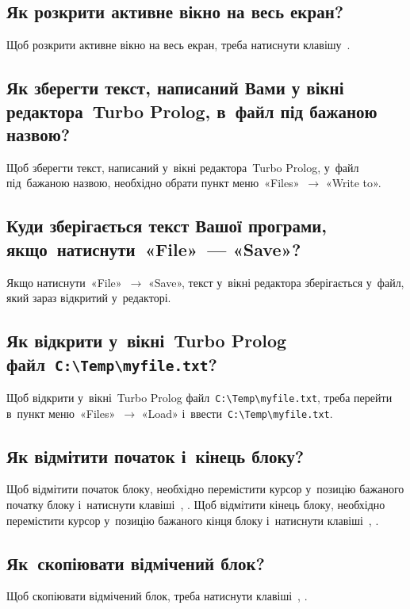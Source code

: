 \documentclass[
	a4paper,
	oneside,
	BCOR = 10mm,
	DIV = 12,
	12pt,
	headings = normal,
]{scrartcl}
\newcommand{\filename}[1]{\texttt{#1}}
\newcommand{\Mytextrightarrow}{$\rightarrow$}
\begin{document}
		\subsection{Як розкрити активне вікно на весь екран?}
			Щоб розкрити активне вікно на весь екран, треба натиснути клавішу~.

		\subsection{Як зберегти текст, написаний Вами у вікні редактора~\textenglish{Turbo Prolog}, в~файл під бажаною назвою?}
			Щоб зберегти текст, написаний у~вікні редактора~\textenglish{Turbo Prolog}, у~файл під~бажаною назвою, необхідно обрати пункт меню~«\textenglish{Files}»~\Mytextrightarrow{ } «\textenglish{Write to}».

		\subsection{Куди зберігається текст Вашої програми, якщо~натиснути~«\textenglish{File}»~— «\textenglish{Save}»?}
			Якщо натиснути~«\textenglish{File}»~\Mytextrightarrow{ } «\textenglish{Save}», текст у~вікні редактора зберігається у~файл, який зараз відкритий у~редакторі. 

		\subsection{Як відкрити у~вікні~\textenglish{Turbo Prolog} файл~\filename{C:\textbackslash{}Temp\textbackslash{}myfile.txt}?}
			Щоб відкрити у~вікні~\textenglish{Turbo Prolog} файл~\filename{C:\textbackslash{}Temp\textbackslash{}myfile.txt}, треба перейти в~пункт меню~«\textenglish{Files}»~\Mytextrightarrow{ } «\textenglish{Load}» і~ввести~\filename{C:\textbackslash{}Temp\textbackslash{}myfile.txt}.

		\subsection{Як відмітити початок і~кінець блоку?}
			Щоб відмітити початок блоку, необхідно перемістити курсор у~позицію бажаного початку блоку і~натиснути клавіші~, . Щоб відмітити кінець блоку, необхідно перемістити курсор у~позицію бажаного кінця блоку і~натиснути клавіші~, .

		\subsection{Як~скопіювати відмічений блок?}
			Щоб скопіювати відмічений блок, треба натиснути клавіші~, . 
\end{document}

